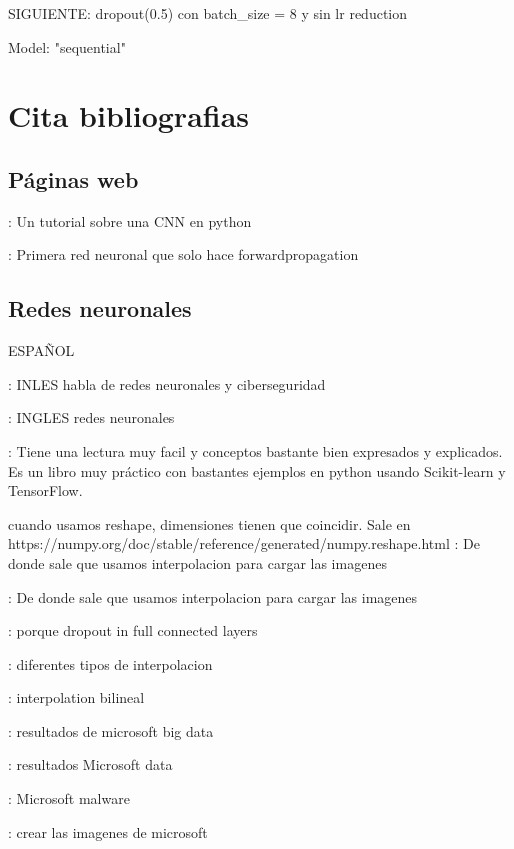 \documentclass[11pt, a4paper]{article} %
\begin{document}
SIGUIENTE:  dropout(0.5) con batch_size = 8 y sin lr reduction 

Model: "sequential"

\section{Cita bibliografias}
\subsection{Páginas web}


\citep{kaggle_cnn_tutorial} : Un tutorial sobre una CNN en python

\citep{conceptos_RN_DesdeCero} : Primera red neuronal que solo hace forwardpropagation


\subsection{Redes neuronales}
\citep{matich2001redes} ESPAÑOL 

\citep{stamp2022artificial} : INLES habla de redes neuronales y ciberseguridad

\citep{tang2007neural} : INGLES redes neuronales



\citep{mirjalili2020python} : Tiene una lectura muy facil y conceptos bastante bien expresados y explicados. Es un libro muy práctico con bastantes ejemplos en python usando Scikit-learn y TensorFlow.

cuando usamos reshape, dimensiones tienen que coincidir. Sale en https://numpy.org/doc/stable/reference/generated/numpy.reshape.html
\citep{ni2018malware} : De donde sale que usamos interpolacion para cargar las imagenes

\citep{zhao2023new} : De donde sale que usamos interpolacion para cargar las imagenes

\citep{hinton2012improving} : porque dropout in full connected layers

\citep{zhao2023new} : diferentes tipos de interpolacion

\citep{he2019malware}: interpolation bilineal

\citep{gibert2019using} : resultados de microsoft big data

\citep{ni2018malware} : resultados Microsoft data

\citep{sharma2024migan} : Microsoft malware

\citep{kornish2018malware} : crear las imagenes de microsoft
\end{document}
